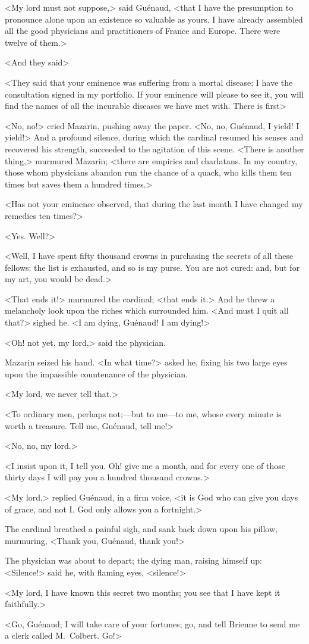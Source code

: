 <My lord must not suppose,> said Guénaud, <that I have the presumption to pronounce alone upon an existence so valuable as yours. I have already assembled all the good physicians and practitioners of France and Europe. There were twelve of them.>

<And they said\longdash>

<They said that your eminence was suffering from a mortal disease; I have the consultation signed in my portfolio. If your eminence will please to see it, you will find the names of all the incurable diseases we have met with. There is first\longdash>

<No, no!> cried Mazarin, pushing away the paper. <No, no, Guénaud, I yield! I yield!> And a profound silence, during which the cardinal resumed his senses and recovered his strength, succeeded to the agitation of this scene. <There is another thing,> murmured Mazarin; <there are empirics and charlatans. In my country, those whom physicians abandon run the chance of a quack, who kills them ten times but saves them a hundred times.>

<Has not your eminence observed, that during the last month I have changed my remedies ten times?>

<Yes. Well?>

<Well, I have spent fifty thousand crowns in purchasing the secrets of all these fellows: the list is exhausted, and so is my purse. You are not cured: and, but for my art, you would be dead.>

<That ends it!> murmured the cardinal; <that ends it.> And he threw a melancholy look upon the riches which surrounded him. <And must I quit all that?> sighed he. <I am dying, Guénaud! I am dying!>

<Oh! not yet, my lord,> said the physician.

Mazarin seized his hand. <In what time?> asked he, fixing his two large eyes upon the impassible countenance of the physician.

<My lord, we never tell that.>

<To ordinary men, perhaps not;—but to me—to me, whose every minute is worth a treasure. Tell me, Guénaud, tell me!>

<No, no, my lord.>

<I insist upon it, I tell you. Oh! give me a month, and for every one of those thirty days I will pay you a hundred thousand crowns.>

<My lord,> replied Guénaud, in a firm voice, <it is God who can give you days of grace, and not I\@. God only allows you a fortnight.>

The cardinal breathed a painful sigh, and sank back down upon his pillow, murmuring, <Thank you, Guénaud, thank you!>

The physician was about to depart; the dying man, raising himself up: <Silence!> said he, with flaming eyes, <silence!>

<My lord, I have known this secret two months; you see that I have kept it faithfully.>

<Go, Guénaud; I will take care of your fortunes; go, and tell Brienne to send me a clerk called M.~Colbert. Go!> 